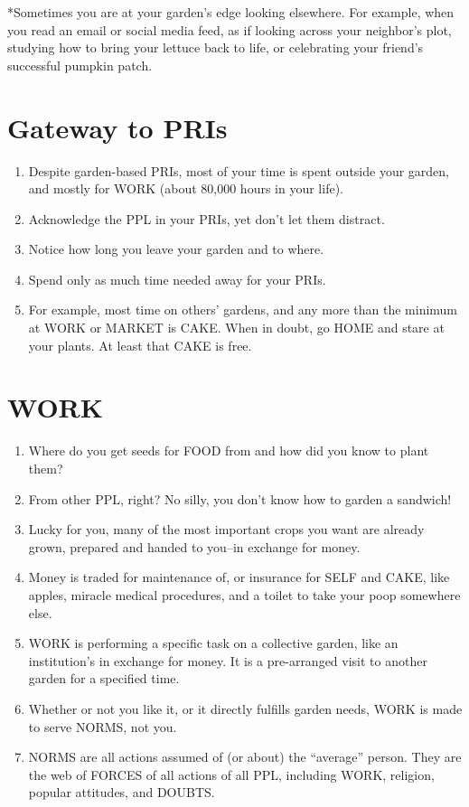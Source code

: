 \documentclass[
]{book}
\providecommand{\tightlist}{%
  \setlength{\itemsep}{0pt}\setlength{\parskip}{0pt}}
\begin{document}
*Sometimes you are at your garden's edge
looking elsewhere.
For example, when you read an email or social media feed,
as if looking across your neighbor's plot,
studying how to bring your lettuce back to life,
or celebrating your friend's successful pumpkin patch.

\hypertarget{gateway-to-pris}{%
\section{Gateway to PRIs}\label{gateway-to-pris}}

\begin{enumerate}
\def\labelenumi{\arabic{enumi}.}
\setcounter{enumi}{2}
\tightlist
\item
  Despite garden-based PRIs, most of your time
  is spent outside your garden, and mostly for WORK (about 80,000 hours in your life).
\item
  Acknowledge the PPL in your PRIs, yet don't let them distract.
\item
  Notice how long you leave your garden and to where.
\item
  Spend only as much time needed away for your PRIs.
\item
  For example, most time on others' gardens, and any more than the minimum at WORK or MARKET is CAKE. When in doubt, go HOME and stare at your plants. At least that CAKE is free.
\end{enumerate}

\hypertarget{work}{%
\section{WORK}\label{work}}

\begin{enumerate}
\def\labelenumi{\arabic{enumi}.}
\setcounter{enumi}{6}
\item
  Where do you get seeds for FOOD from and how did you know to plant them?
\item
  From other PPL, right? No silly, you don't know how to garden a sandwich!
\item
  Lucky for you, many of the most important crops you want are already grown, prepared and handed to you--in exchange for money.
\item
  Money is traded for maintenance of, or insurance for SELF and CAKE, like apples, miracle medical procedures, and a toilet to take your poop somewhere else.
\item
  WORK is performing a specific task on a collective garden, like an institution's in exchange for money. It is a pre-arranged visit to another garden for a specified time.
\item
  Whether or not you like it, or it directly fulfills garden needs, WORK is made to serve NORMS, not you.
\item
  NORMS are all actions assumed of (or about) the ``average'' person. They are the web of FORCES of all actions of all PPL, including WORK, religion, popular attitudes, and DOUBTS.
\end{enumerate}
\end{document}
